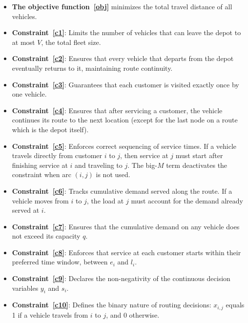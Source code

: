 \documentclass[11pt]{article}
\begin{document}
\begin{itemize}
    \item \textbf{The objective function~\eqref{obj}} minimizes the total travel distance of all vehicles.
    \item \textbf{Constraint~\eqref{c1}}: Limits the number of vehicles that can leave the depot to at most $V$, the total fleet size.
    \item \textbf{Constraint~\eqref{c2}}: Ensures that every vehicle that departs from the depot eventually returns to it, maintaining route continuity.
    \item \textbf{Constraint~\eqref{c3}}: Guarantees that each customer is visited exactly once by one vehicle.
    \item \textbf{Constraint~\eqref{c4}}: Ensures that after servicing a customer, the vehicle continues its route to the next location (except for the last node on a route which is the depot itself).
    \item \textbf{Constraint~\eqref{c5}}: Enforces correct sequencing of service times. If a vehicle travels directly from customer $i$ to $j$, then service at $j$ must start after finishing service at $i$ and traveling to $j$. The big-$M$ term deactivates the constraint when arc $(i,j)$ is not used.
    \item \textbf{Constraint~\eqref{c6}}: Tracks cumulative demand served along the route. If a vehicle moves from $i$ to $j$, the load at $j$ must account for the demand already served at $i$.
    \item \textbf{Constraint~\eqref{c7}}: Ensures that the cumulative demand on any vehicle does not exceed its capacity $q$.
    \item \textbf{Constraint~\eqref{c8}}: Enforces that service at each customer starts within their preferred time window, between $e_i$ and $l_i$.
    \item \textbf{Constraint~\eqref{c9}}: Declares the non-negativity of the continuous decision variables $y_i$ and $s_i$.
    \item \textbf{Constraint~\eqref{c10}}: Defines the binary nature of routing decisions: $x_{i,j}$ equals 1 if a vehicle travels from $i$ to $j$, and 0 otherwise.
\end{itemize}
\end{document}
